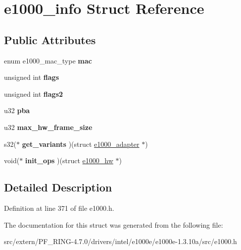 \hypertarget{structe1000__info}{
\section{e1000\_\-info Struct Reference}
\label{structe1000__info}
}
\subsection*{Public Attributes}
\begin{DoxyCompactItemize}
\item 
\hypertarget{structe1000__info_a523260d836863bb7146c54ed3ddab82e}{
enum e1000\_\-mac\_\-type {\bfseries mac}}
\label{structe1000__info_a523260d836863bb7146c54ed3ddab82e}

\item 
\hypertarget{structe1000__info_a4e89050278194905651a7789e223ffa2}{
unsigned int {\bfseries flags}}
\label{structe1000__info_a4e89050278194905651a7789e223ffa2}

\item 
\hypertarget{structe1000__info_af77bde4de0db83465a00ba7577e07e32}{
unsigned int {\bfseries flags2}}
\label{structe1000__info_af77bde4de0db83465a00ba7577e07e32}

\item 
\hypertarget{structe1000__info_a8f71b5ebab604072cf42e2adfee38ee9}{
u32 {\bfseries pba}}
\label{structe1000__info_a8f71b5ebab604072cf42e2adfee38ee9}

\item 
\hypertarget{structe1000__info_ae0869f2995dc91df4bd56a9f694d8e30}{
u32 {\bfseries max\_\-hw\_\-frame\_\-size}}
\label{structe1000__info_ae0869f2995dc91df4bd56a9f694d8e30}

\item 
\hypertarget{structe1000__info_a10f0f4f34fafaeb8659ef2ce092259b1}{
s32($\ast$ {\bfseries get\_\-variants} )(struct \hyperlink{structe1000__adapter}{e1000\_\-adapter} $\ast$)}
\label{structe1000__info_a10f0f4f34fafaeb8659ef2ce092259b1}

\item 
\hypertarget{structe1000__info_aaaafc32100f2aa24c3e7ab3f266cdf26}{
void($\ast$ {\bfseries init\_\-ops} )(struct \hyperlink{structe1000__hw}{e1000\_\-hw} $\ast$)}
\label{structe1000__info_aaaafc32100f2aa24c3e7ab3f266cdf26}

\end{DoxyCompactItemize}


\subsection{Detailed Description}


Definition at line 371 of file e1000.h.



The documentation for this struct was generated from the following file:\begin{DoxyCompactItemize}
\item 
src/extern/PF\_\-RING-\/4.7.0/drivers/intel/e1000e/e1000e-\/1.3.10a/src/e1000.h\end{DoxyCompactItemize}
